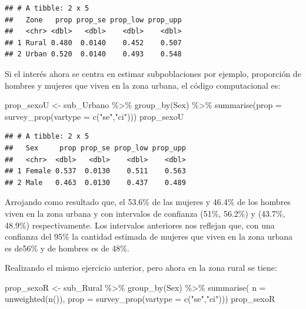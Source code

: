 \documentclass[
  12pt,
]{book}
\newenvironment{Shaded}{\begin{snugshade}}{\end{snugshade}}
\newcommand{\AttributeTok}[1]{\textcolor[rgb]{0.77,0.63,0.00}{#1}}
\newcommand{\FunctionTok}[1]{\textcolor[rgb]{0.00,0.00,0.00}{#1}}
\newcommand{\NormalTok}[1]{#1}
\newcommand{\OtherTok}[1]{\textcolor[rgb]{0.56,0.35,0.01}{#1}}
\newcommand{\SpecialCharTok}[1]{\textcolor[rgb]{0.00,0.00,0.00}{#1}}
\newcommand{\StringTok}[1]{\textcolor[rgb]{0.31,0.60,0.02}{#1}}
\begin{document}
\begin{verbatim}
## # A tibble: 2 x 5
##   Zone   prop prop_se prop_low prop_upp
##   <chr> <dbl>   <dbl>    <dbl>    <dbl>
## 1 Rural 0.480  0.0140    0.452    0.507
## 2 Urban 0.520  0.0140    0.493    0.548
\end{verbatim}

Si el interés ahora se centra en estimar subpoblaciones por ejemplo, proporción de hombres y mujeres que viven en la zona urbana, el código computacional es:

\begin{Shaded}
\begin{Highlighting}[]
\NormalTok{prop\_sexoU }\OtherTok{\textless{}{-}}\NormalTok{ sub\_Urbano }\SpecialCharTok{\%\textgreater{}\%} \FunctionTok{group\_by}\NormalTok{(Sex) }\SpecialCharTok{\%\textgreater{}\%} 
              \FunctionTok{summarise}\NormalTok{(}\AttributeTok{prop =} \FunctionTok{survey\_prop}\NormalTok{(}\AttributeTok{vartype =} \FunctionTok{c}\NormalTok{(}\StringTok{"se"}\NormalTok{,}\StringTok{"ci"}\NormalTok{)))}
\NormalTok{prop\_sexoU}
\end{Highlighting}
\end{Shaded}

\begin{verbatim}
## # A tibble: 2 x 5
##   Sex     prop prop_se prop_low prop_upp
##   <chr>  <dbl>   <dbl>    <dbl>    <dbl>
## 1 Female 0.537  0.0130    0.511    0.563
## 2 Male   0.463  0.0130    0.437    0.489
\end{verbatim}

Arrojando como resultado que, el 53.6\% de las mujeres y 46.4\% de los hombres viven en la zona urbana y con intervalos de confianza (51\%, 56.2\%) y (43.7\%, 48.9\%) respectivamente. Los intervalos anteriores nos reflejan que, con una confianza del 95\% la cantidad estimada de mujeres que viven en la zona urbana es de56\% y de hombres es de 48\%.

Realizando el mismo ejercicio anterior, pero ahora en la zona rural se tiene:

\begin{Shaded}
\begin{Highlighting}[]
\NormalTok{prop\_sexoR }\OtherTok{\textless{}{-}}\NormalTok{ sub\_Rural }\SpecialCharTok{\%\textgreater{}\%} \FunctionTok{group\_by}\NormalTok{(Sex) }\SpecialCharTok{\%\textgreater{}\%} 
              \FunctionTok{summarise}\NormalTok{( }\AttributeTok{n =} \FunctionTok{unweighted}\NormalTok{(}\FunctionTok{n}\NormalTok{()),}
                         \AttributeTok{prop =} \FunctionTok{survey\_prop}\NormalTok{(}\AttributeTok{vartype =} \FunctionTok{c}\NormalTok{(}\StringTok{"se"}\NormalTok{,}\StringTok{"ci"}\NormalTok{)))}
\NormalTok{prop\_sexoR}
\end{Highlighting}
\end{Shaded}
\end{document}
